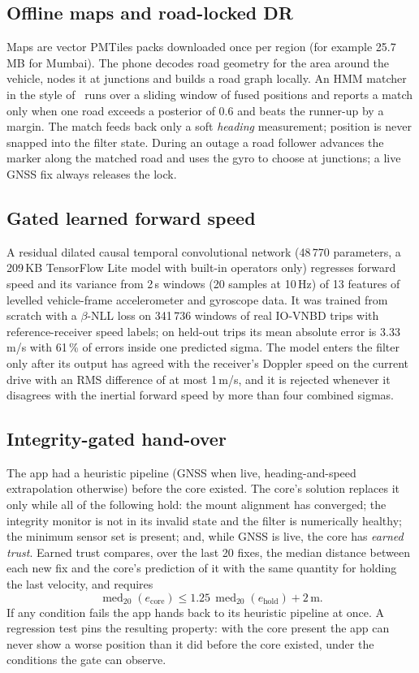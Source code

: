 \documentclass[conference]{IEEEtran}
\begin{document}
\subsection{Offline maps and road-locked DR}
Maps are vector PMTiles packs downloaded once per region (for example 25.7\,MB
for Mumbai). The phone decodes road geometry for the area around the vehicle,
nodes it at junctions and builds a road graph locally. An HMM matcher in the
style of~\cite{newson2009hmm} runs over a sliding window of fused positions and
reports a match only when one road exceeds a posterior of 0.6 and beats the
runner-up by a margin. The match feeds back only a soft \emph{heading}
measurement; position is never snapped into the filter state. During an outage
a road follower advances the marker along the matched road and uses the gyro
to choose at junctions; a live GNSS fix always releases the lock.

\subsection{Gated learned forward speed}
A residual dilated causal temporal convolutional network (48\,770 parameters,
a 209\,KB TensorFlow Lite model with built-in operators only) regresses forward
speed and its variance from 2\,s windows (20 samples at 10\,Hz) of 13 features
of levelled vehicle-frame accelerometer and gyroscope data. It was trained from
scratch with a $\beta$-NLL loss on 341\,736 windows of real IO-VNBD trips with
reference-receiver speed labels; on held-out trips its mean absolute error is
3.33\,m/s with 61\,\% of errors inside one predicted sigma. The model enters the filter only after its output
has agreed with the receiver's Doppler speed on the current drive with an RMS
difference of at most 1\,m/s, and it is rejected whenever it disagrees with the
inertial forward speed by more than four combined sigmas.

\subsection{Integrity-gated hand-over}
\label{sec:gate}
The app had a heuristic pipeline (GNSS when live, heading-and-speed
extrapolation otherwise) before the core existed. The core's solution replaces
it only while all of the following hold: the mount alignment has converged;
the integrity monitor is not in its invalid state and the filter is
numerically healthy; the minimum sensor set is present; and, while GNSS is
live, the core has \emph{earned trust}. Earned trust compares, over the last
20 fixes, the median distance between each new fix and the core's prediction
of it with the same quantity for holding the last velocity, and requires
\begin{equation}
\operatorname{med}_{20}\!\left(e_{\mathrm{core}}\right) \le
1.25\,\operatorname{med}_{20}\!\left(e_{\mathrm{hold}}\right) + 2\,\mathrm{m}.
\end{equation}
If any condition fails the app hands back to its heuristic pipeline at once.
A regression test pins the resulting property: with the core present the app
can never show a worse position than it did before the core existed, under
the conditions the gate can observe.
\end{document}
